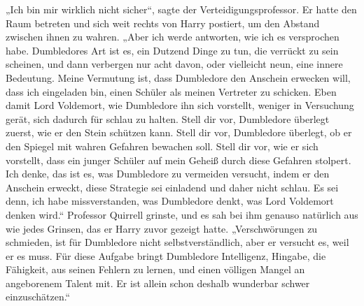 „Ich bin mir wirklich nicht sicher“, sagte der Verteidigungsprofessor.
Er hatte den Raum betreten und sich weit rechts von Harry postiert, um den Abstand zwischen ihnen zu wahren.
„Aber ich werde antworten, wie ich es versprochen habe. Dumbledores Art ist es, ein Dutzend Dinge zu tun, die verrückt zu sein scheinen, und dann verbergen nur acht davon, oder vielleicht neun, eine innere Bedeutung. Meine Vermutung ist, dass Dumbledore den Anschein erwecken will, dass ich eingeladen bin, einen Schüler als meinen Vertreter zu schicken. Eben damit Lord Voldemort, wie Dumbledore ihn sich vorstellt, weniger in Versuchung gerät, sich dadurch für schlau zu halten. Stell dir vor, Dumbledore überlegt zuerst, wie er den Stein schützen kann. Stell dir vor, Dumbledore überlegt, ob er den Spiegel mit wahren Gefahren bewachen soll. Stell dir vor, wie er sich vorstellt, dass ein junger Schüler auf mein Geheiß durch diese Gefahren stolpert. Ich denke, das ist es, was Dumbledore zu vermeiden versucht, indem er den Anschein erweckt, diese Strategie sei einladend und daher nicht schlau. Es sei denn, ich habe missverstanden, was Dumbledore denkt, was Lord Voldemort denken wird.“
Professor Quirrell grinste, und es sah bei ihm genauso natürlich aus wie jedes Grinsen, das er Harry zuvor gezeigt hatte.
„Verschwörungen zu schmieden, ist für Dumbledore nicht selbstverständlich, aber er versucht es, weil er es muss. Für diese Aufgabe bringt Dumbledore Intelligenz, Hingabe, die Fähigkeit, aus seinen Fehlern zu lernen, und einen völligen Mangel an angeborenem Talent mit. Er ist allein schon deshalb wunderbar schwer einzuschätzen.“

